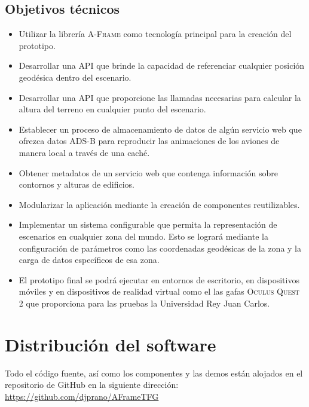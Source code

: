 \documentclass[a4paper, 11pt]{book}
\begin{document}
\subsection{Objetivos técnicos}
\begin{itemize}
	\item Utilizar la librería \textsc{A-Frame} como tecnología principal para la creación del prototipo.
	\item Desarrollar una \gls{API} que brinde la capacidad de referenciar cualquier posición geodésica dentro del escenario.
	\item Desarrollar una \gls{API} que proporcione las llamadas necesarias para calcular la altura del terreno en cualquier punto del escenario.
	\item Establecer un proceso de almacenamiento de datos de algún servicio web que ofrezca datos \textsc{ADS-B} para reproducir las animaciones de los aviones de manera local a través de una caché.
	\item Obtener metadatos de un servicio web que contenga información sobre contornos y alturas de edificios.
	\item Modularizar la aplicación mediante la creación de componentes reutilizables.
	\item Implementar un sistema configurable que permita la representación de escenarios en cualquier zona del mundo. Esto se logrará mediante la configuración de parámetros como las coordenadas geodésicas de la zona y la carga de datos específicos de esa zona.
	\item El prototipo final se podrá ejecutar en entornos de escritorio, en dispositivos móviles y en dispositivos de realidad virtual como el las gafas \textsc{Oculus Quest 2} que proporciona para las pruebas la Universidad Rey Juan Carlos. 
\end{itemize}
\newpage
\section{Distribución del software}
\label{sec:planificacion-temporal}
Todo el código fuente, así como los componentes y las demos están alojados en el repositorio de GitHub en la siguiente dirección: \url{https://github.com/djprano/AFrameTFG}
\end{document}
